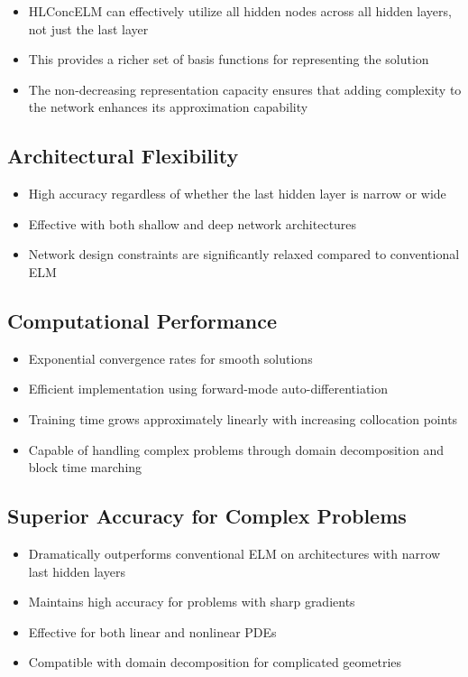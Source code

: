 \documentclass[11pt,a4paper]{article}
\begin{document}
\begin{itemize}
    \item HLConcELM can effectively utilize all hidden nodes across all hidden layers, not just the last layer
    \item This provides a richer set of basis functions for representing the solution
    \item The non-decreasing representation capacity ensures that adding complexity to the network enhances its approximation capability
\end{itemize}

\subsection{Architectural Flexibility}

\begin{itemize}
    \item High accuracy regardless of whether the last hidden layer is narrow or wide
    \item Effective with both shallow and deep network architectures
    \item Network design constraints are significantly relaxed compared to conventional ELM
\end{itemize}

\subsection{Computational Performance}

\begin{itemize}
    \item Exponential convergence rates for smooth solutions
    \item Efficient implementation using forward-mode auto-differentiation
    \item Training time grows approximately linearly with increasing collocation points
    \item Capable of handling complex problems through domain decomposition and block time marching
\end{itemize}

\subsection{Superior Accuracy for Complex Problems}

\begin{itemize}
    \item Dramatically outperforms conventional ELM on architectures with narrow last hidden layers
    \item Maintains high accuracy for problems with sharp gradients
    \item Effective for both linear and nonlinear PDEs
    \item Compatible with domain decomposition for complicated geometries
\end{itemize}
\end{document}
